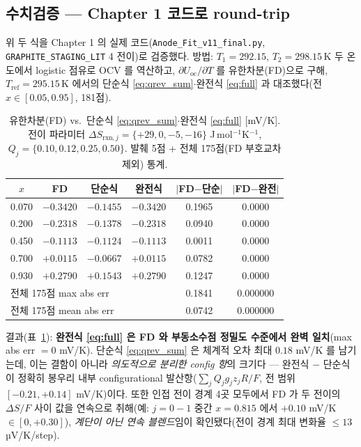 \documentclass[11pt,a4paper]{article}
\newcommand{\rxn}{\mathrm{rxn}}
\newcommand{\oc}{\mathrm{oc}}
\begin{document}
\subsection{수치검증 — Chapter 1 코드로 round-trip}
위 두 식을 Chapter 1 의 실제 코드(\texttt{Anode\_Fit\_v11\_final.py}, \texttt{GRAPHITE\_STAGING\_LIT}
4 전이)로 검증했다. 방법: $T_1{=}292.15$, $T_2{=}298.15$\,K 두 온도에서 logistic 점유로 OCV 를 역산하고,
$\partial U_\oc/\partial T$ 를 유한차분(FD)으로 구해, $T_\mathrm{ref}{=}295.15$\,K 에서의 단순식
\eqref{eq:qrev_sum}$\cdot$완전식 \eqref{eq:full} 과 대조했다(전 $x\in[0.05,0.95]$, 181점).

\begin{table}[t]
\centering\small
\renewcommand{\arraystretch}{1.2}
\caption{유한차분(FD) vs.\ 단순식 \eqref{eq:qrev_sum}$\cdot$완전식 \eqref{eq:full} [mV/K]. 전이 파라미터
$\Delta S_{\rxn,j}=\{+29,0,-5,-16\}$ J\,mol$^{-1}$K$^{-1}$, $Q_j=\{0.10,0.12,0.25,0.50\}$. 발췌
5점 + 전체 175점(FD 부호교차 제외) 통계.}
\label{tab:verify}
\begin{tabular}{c c c c c c}
\toprule
$x$ & FD & 단순식 & 완전식 & $|$FD$-$단순$|$ & $|$FD$-$완전$|$ \\
\midrule
0.070 & $-0.3420$ & $-0.1455$ & $-0.3420$ & 0.1965 & $0.0000$ \\
0.200 & $-0.2318$ & $-0.1378$ & $-0.2318$ & 0.0940 & $0.0000$ \\
0.450 & $-0.1113$ & $-0.1124$ & $-0.1113$ & 0.0011 & $0.0000$ \\
0.700 & $+0.0115$ & $-0.0667$ & $+0.0115$ & 0.0782 & $0.0000$ \\
0.930 & $+0.2790$ & $+0.1543$ & $+0.2790$ & 0.1247 & $0.0000$ \\
\midrule
\multicolumn{4}{l}{\footnotesize 전체 175점 max abs err} & 0.1841 & $0.000000$ \\
\multicolumn{4}{l}{\footnotesize 전체 175점 mean abs err} & 0.0742 & $0.000000$ \\
\bottomrule
\end{tabular}
\end{table}

결과(표~\ref{tab:verify}): \textbf{완전식 \eqref{eq:full} 은 FD 와 부동소수점 정밀도 수준에서 완벽
일치}(max abs err $=0$ mV/K). 단순식 \eqref{eq:qrev_sum} 은 체계적 오차 최대 $0.18$ mV/K 를 남기는데,
이는 결함이 아니라 \emph{의도적으로 분리한 config 항}의 크기다 — 완전식 $-$ 단순식이 정확히 봉우리 내부
configurational 발산항($\sum_j Q_jg_j z_j R/F$, 전 범위 $[-0.21,+0.14]$ mV/K)이다. 또한 인접 전이 경계
4곳 모두에서 FD 가 두 전이의 $\Delta S/F$ 사이 값을 연속으로 취해(예: $j{=}0\!-\!1$ 중간 $x{=}0.815$ 에서
$+0.10$ mV/K $\in[0,+0.30]$), \emph{계단이 아닌 연속 블렌드}임이 확인됐다(전이 경계 최대 변화율
$\le13$ µV/K/step).
\end{document}
